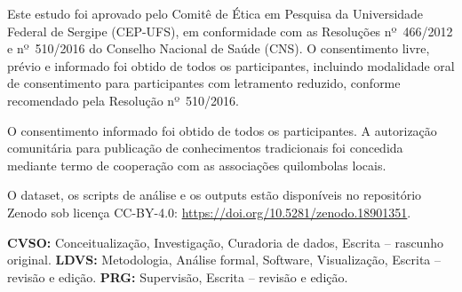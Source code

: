 \documentclass[pdflatex,sn-basic]{sn-jnl}%
\theoremstyle{thmstyleone}%
\theoremstyle{thmstyletwo}%
\theoremstyle{thmstylethree}%
\begin{document}

Este estudo foi aprovado pelo Comitê de Ética em Pesquisa da Universidade Federal de Sergipe (CEP-UFS), em conformidade com as Resoluções nº~466/2012 e nº~510/2016 do Conselho Nacional de Saúde (CNS). O consentimento livre, prévio e informado foi obtido de todos os participantes, incluindo modalidade oral de consentimento para participantes com letramento reduzido, conforme recomendado pela Resolução nº~510/2016.


O consentimento informado foi obtido de todos os participantes. A autorização comunitária para publicação de conhecimentos tradicionais foi concedida mediante termo de cooperação com as associações quilombolas locais.


O dataset, os scripts de análise e os outputs estão disponíveis no repositório Zenodo sob licença CC-BY-4.0: \url{https://doi.org/10.5281/zenodo.18901351}.


\textbf{CVSO:} Conceitualização, Investigação, Curadoria de dados, Escrita -- rascunho original. \textbf{LDVS:} Metodologia, Análise formal, Software, Visualização, Escrita -- revisão e edição. \textbf{PRG:} Supervisão, Escrita -- revisão e edição.




\fi
\end{document}
